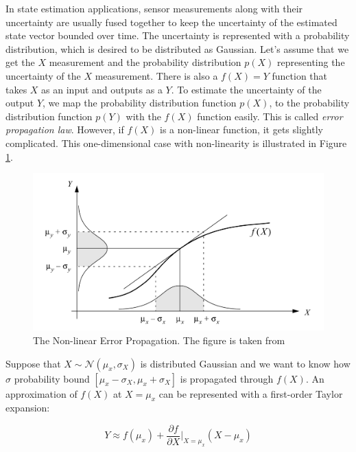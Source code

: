 \documentclass[a4paper]{report}
\numberwithin{figure}{section}
\begin{document}
\begin{appendices}
In state estimation applications, sensor measurements along with their uncertainty are 
usually fused together to keep the uncertainty of the estimated state vector 
bounded 
over time. 
The uncertainty is represented with a probability distribution, 
which is desired to be distributed as Gaussian. 
Let's assume that we get the $X$ measurement and the probability distribution 
$p(X)$ representing the uncertainty of the $X$ measurement. 
There is also a $f(X)=Y$ function that takes $X$ as an input and outputs 
as a $Y$. 
To estimate the uncertainty of the output $Y$, 
we map the probability distribution function $p(X)$, 
to the probability distribution function $p(Y)$ with the $f(X)$ function 
easily.
This is called 
\textit{error propagation law}. However, if $f(X)$ is a non-linear function, 
it gets slightly complicated. This one-dimensional case with non-linearity is 
illustrated in Figure \ref{fig:error_propagation}.

\begin{figure}[H]
	\centering
	\includegraphics[width=\linewidth,natwidth=640,natheight=640]
	{fig/ref_imgs/error_propagation.jpg}
\caption[The Non-linear Error Propagation]
{The Non-linear Error Propagation. The figure is taken from 
\parencite{Arras1998b}}
  \label{fig:error_propagation}
\end{figure}

Suppose that $X\sim \mathcal{N}(\mu_x, \sigma_X)$ is distributed Gaussian 
and we want to know how $\sigma$ probability bound 
$[\mu_x-\sigma_X, \mu_x+\sigma_X]$ is propagated through $f(X)$.
An approximation of $f(X)$ at $X=\mu_x$ can be represented with 
a first-order Taylor expansion:

\begin{equation}
  Y \approx f(\mu_x) + \frac{\partial f}{\partial X}\bigg|_{X=\mu_x} (X-\mu_x) 
\end{equation}


\end{appendices}
\end{document}
